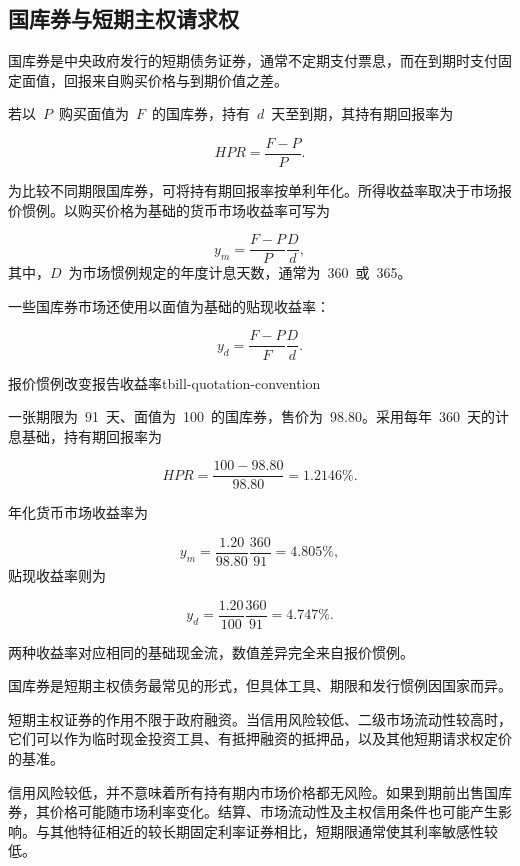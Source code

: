 \subsection{国库券与短期主权请求权}

国库券是中央政府发行的短期债务证券，通常不定期支付票息，而在到期时支付固定面值，回报来自购买价格与到期价值之差。

若以~\(P\)~购买面值为~\(F\)~的国库券，持有~\(d\)~天至到期，其持有期回报率为

\begin{equation}
HPR=\frac{F-P}{P}.
\label{eq:ch7-tbill-hpr}
\end{equation}

为比较不同期限国库券，可将持有期回报率按单利年化。所得收益率取决于市场报价惯例。以购买价格为基础的货币市场收益率可写为

\begin{equation}
y_m=\frac{F-P}{P}\frac{D}{d},
\label{eq:ch7-money-market-yield}
\end{equation}
其中，$D$~为市场惯例规定的年度计息天数，通常为~360~或~365。

一些国库券市场还使用以面值为基础的贴现收益率：

\begin{equation}
y_d=\frac{F-P}{F}\frac{D}{d}.
\label{eq:ch7-discount-yield}
\end{equation}

\begin{example}{报价惯例改变报告收益率}{tbill-quotation-convention}

一张期限为~91~天、面值为~100~的国库券，售价为~98.80。采用每年~360~天的计息基础，持有期回报率为

\[
HPR=\frac{100-98.80}{98.80}=1.2146\%.
\]

年化货币市场收益率为

\[
y_m=\frac{1.20}{98.80}\frac{360}{91}=4.805\%,
\]
贴现收益率则为

\[
y_d=\frac{1.20}{100}\frac{360}{91}=4.747\%.
\]

两种收益率对应相同的基础现金流，数值差异完全来自报价惯例。

\end{example}

国库券是短期主权债务最常见的形式，但具体工具、期限和发行惯例因国家而异。

短期主权证券的作用不限于政府融资。当信用风险较低、二级市场流动性较高时，它们可以作为临时现金投资工具、有抵押融资的抵押品，以及其他短期请求权定价的基准。

信用风险较低，并不意味着所有持有期内市场价格都无风险。如果到期前出售国库券，其价格可能随市场利率变化。结算、市场流动性及主权信用条件也可能产生影响。与其他特征相近的较长期固定利率证券相比，短期限通常使其利率敏感性较低。

